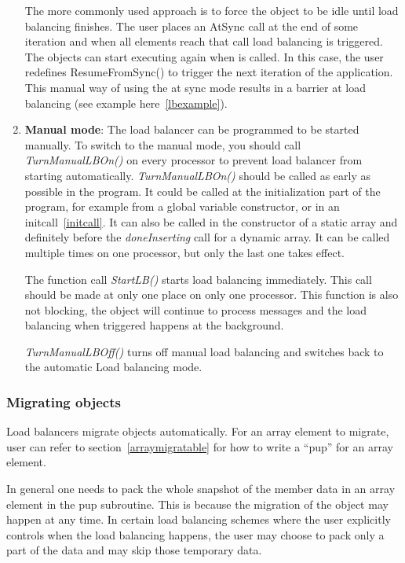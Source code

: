 \begin{enumerate}
The more commonly used approach is to force the object to be idle until load
balancing finishes. The user places an AtSync call at the end of some iteration
and when all elements reach that call load balancing is triggered. The objects
can start executing again when  is called. In this case,
the user redefines ResumeFromSync() to trigger the next iteration of the
application. This manual way of using the at sync mode results in a barrier at
load balancing (see example here~\ref{lbexample}).
%
\item {\bf Manual mode}: The load balancer can be programmed to be started
manually. To switch to the manual mode, you should call {\em TurnManualLBOn()}
on every processor to prevent load balancer from starting automatically. {\em
TurnManualLBOn()} should be called as early as possible in the program. It
could be called at the initialization part of the program, for example from a
global variable constructor, or in an initcall~\ref{initcall}.  It can also be
called in the constructor of a static array and definitely before the {\em
doneInserting} call for a dynamic array.  It can be called multiple times on
one processor, but only the last one takes effect.

The function call {\em StartLB()} starts load balancing immediately. This call
should be made at only one place on only one processor. This function is also
not blocking, the object will continue to process messages and the load
balancing when triggered happens at the background.

{\em TurnManualLBOff()} turns off manual load balancing and switches back to
the automatic Load balancing mode.
%
\end{enumerate}

\subsubsection{Migrating objects}

\label{lbmigobj}

Load balancers migrate objects automatically.
For an array element to migrate, user can refer to section~\ref{arraymigratable}
for how to write a ``pup'' for an array element.

In general one needs to pack the whole snapshot of the member data in an 
array element in the pup subroutine. This is because the migration of
the object may happen at any time. In certain load balancing schemes where
 the user explicitly controls when the load balancing happens, the user may choose
to pack only a part of the data and may skip those temporary data.

